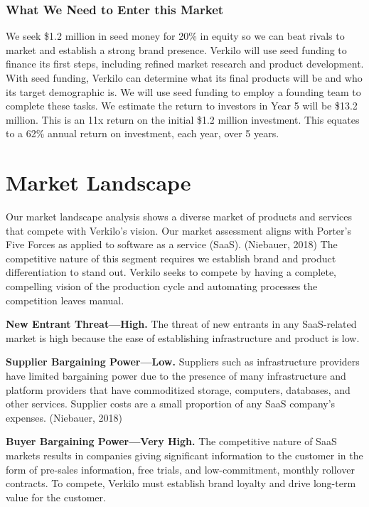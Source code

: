 \documentclass[11pt,openany]{book}
\begin{document}
\hypertarget{what-we-need-to-enter-this-market}{%
\subsubsection{What We Need to Enter this
Market}\label{what-we-need-to-enter-this-market}}

We seek \$1.2 million in seed money for 20\% in equity so we can beat
rivals to market and establish a strong brand presence. Verkilo will use
seed funding to finance its first steps, including refined market
research and product development. With seed funding, Verkilo can
determine what its final products will be and who its target demographic
is. We will use seed funding to employ a founding team to complete these
tasks. We estimate the return to investors in Year 5 will be \$13.2
million. This is an 11x return on the initial \$1.2 million investment.
This equates to a 62\% annual return on investment, each year, over 5
years.

\hypertarget{market-landscape}{%
\section{Market Landscape}\label{market-landscape}}

Our market landscape analysis shows a diverse market of products and
services that compete with Verkilo's vision. Our market assessment
aligns with Porter's Five Forces as applied to software as a service
(SaaS). (Niebauer, 2018) The competitive nature of this segment requires
we establish brand and product differentiation to stand out. Verkilo
seeks to compete by having a complete, compelling vision of the
production cycle and automating processes the competition leaves manual.

\textbf{New Entrant Threat---High.} The threat of new entrants in any
SaaS-related market is high because the ease of establishing
infrastructure and product is low.

\textbf{Supplier Bargaining Power---Low.} Suppliers such as
infrastructure providers have limited bargaining power due to the
presence of many infrastructure and platform providers that have
commoditized storage, computers, databases, and other services. Supplier
costs are a small proportion of any SaaS company's expenses. (Niebauer,
2018)

\textbf{Buyer Bargaining Power---Very High.} The competitive nature of
SaaS markets results in companies giving significant information to the
customer in the form of pre-sales information, free trials, and
low-commitment, monthly rollover contracts. To compete, Verkilo must
establish brand loyalty and drive long-term value for the customer.
\end{document}
